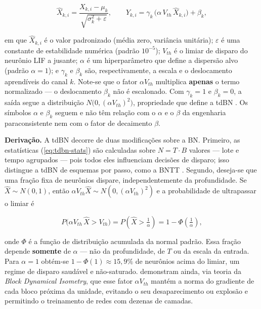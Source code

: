 				\begin{equation}
					\label{eq:tdbn-out}
					\hat{X}_{k,i} = \frac{X_{k,i}-\mu_k}{\sqrt{\sigma_k^2 + \varepsilon}}, \qquad
					Y_{k,i} = \gamma_k\,\big(\alpha\,V_{th}\,\hat{X}_{k,i}\big) + \beta_k,
				\end{equation}

				\par em que $\hat{X}_{k,i}$ é o valor padronizado (média zero, variância unitária); $\varepsilon$ é uma constante de estabilidade numérica (padrão $10^{-5}$); $V_{th}$ é o limiar de disparo do neurônio LIF a jusante; $\alpha$ é um hiperparâmetro que define a dispersão alvo (padrão $\alpha=1$); e $\gamma_k$ e $\beta_k$ são, respectivamente, a escala e o deslocamento aprendíveis do canal $k$. Note-se que o fator $\alpha V_{th}$ multiplica \textbf{apenas} o termo normalizado --- o deslocamento $\beta_k$ não é escalonado. Com $\gamma_k=1$ e $\beta_k=0$, a saída segue a distribuição $N\!\big(0,(\alpha V_{th})^2\big)$, propriedade que define a tdBN \cite{zheng2021goingdeeper}. Os símbolos $\alpha$ e $\beta_k$ seguem  e não têm relação com o $\alpha$ e o $\beta$ da engenharia paraconsistente nem com o fator de decaimento $\beta$.

				\par \textbf{Derivação.} A tdBN decorre de duas modificações sobre a BN. Primeiro, as estatísticas (\autoref{eq:tdbn-stats}) são calculadas sobre $N=T\cdot B$ valores --- lote e tempo agrupados --- pois todos eles influenciam decisões de disparo; isso distingue a tdBN de esquemas por passo, como a BNTT \cite{kim2021bntt}. Segundo, deseja-se que uma fração fixa de neurônios dispare, independentemente da profundidade. Se $\hat{X}\sim N(0,1)$, então $\alpha V_{th}\hat{X}\sim N(0,(\alpha V_{th})^2)$ e a probabilidade de ultrapassar o limiar é

				\begin{equation}
					\label{eq:tdbn-prob}
					P\big(\alpha V_{th}\,\hat{X} > V_{th}\big) = P\!\left(\hat{X} > \tfrac{1}{\alpha}\right) = 1 - \Phi\!\left(\tfrac{1}{\alpha}\right),
				\end{equation}

				\par onde $\Phi$ é a função de distribuição acumulada da normal padrão. Essa fração depende \textbf{somente} de $\alpha$ --- não da profundidade, de $T$ ou da escala da entrada. Para $\alpha=1$ obtém-se $1-\Phi(1)\approx 15{,}9\%$ de neurônios acima do limiar, um regime de disparo saudável e não-saturado.  demonstram ainda, via teoria da \textit{Block Dynamical Isometry}, que esse fator $\alpha V_{th}$ mantém a norma do gradiente de cada bloco próxima da unidade, evitando o seu desaparecimento ou explosão e permitindo o treinamento de redes com dezenas de camadas.

